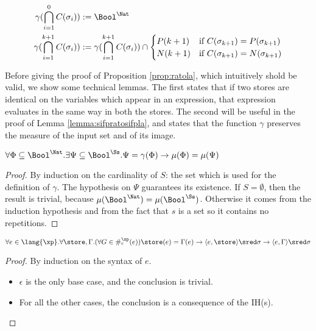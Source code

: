\begin{defn}
  \label{def:gamma}
  \begin{align*}
    \gamma(\bigcap_{i=1}^0C(\sigma_i))&:= \Bool^\Nat\\
    \gamma(\bigcap_{i=1}^{k+1}C(\sigma_i))&:=\gamma(\bigcap_{i=1}^{k+1}C(\sigma_i)) \cap \begin{cases}
      P(k+1) &\text{if } C(\sigma_{k+1})=P(\sigma_{k+1})\\
      N(k+1) &\text{if } C(\sigma_{k+1})=N(\sigma_{k+1})\\
    \end{cases}\\
  \end{align*}
\end{defn}

Before giving the proof of Proposition \ref{prop:ratola},
which intuitively shold be valid, we show some technical lemmas.
%
The first states that if two stores are identical on the variables which appear
in an expression, that expression evaluates in the same way in both the stores.
%
The second will be useful in the proof of Lemma \ref{lemma:sifpratosifpla}, and
states that the function $\gamma$ preserves the measure of the input set and of
its image.

\begin{lemma}
  \label{lemma:measureofgamma}
  $\forall \Phi \subseteq \Bool^\Nat. \exists \Psi \subseteq \Bool^\Ss.
  \Psi = \gamma(\Phi)\to \mu(\Phi)=\mu(\Psi)$
\end{lemma}
\begin{proof}
  By induction on the cardinality of $S$: the set which is used for the definition
  of $\gamma$. The hypothesis on $\Psi$ guarantees its existence.
  If $S=\emptyset$, then the result is trivial, because $\mu(\Bool^\Nat)=\mu(\Bool^\Ss)$.
  Otherwise it comes from the induction hypothesis and from the fact that $s$ is
  a set so it contains no repetitions.
\end{proof}


\begin{lemma}
  \label{lemma:expred}
  $\forall e \in \lang{\xp}.\forall \store, \Gamma.
  (\forall G \in \#_r^\xp(e)) \store(e)=\Gamma(e)\to
  \langle e, \store\rangle \sred \sigma \to \langle e, \Gamma\rangle \sred \sigma$
\end{lemma}
\begin{proof}
  By induction on the syntax of $e$.
  \begin{itemize}
    \item $\epsilon$ is the only base case, and the conclusion is trivial.
    \item For all the other cases, the conclusion is a consequence of the IH(s).
  \end{itemize}
\end{proof}

